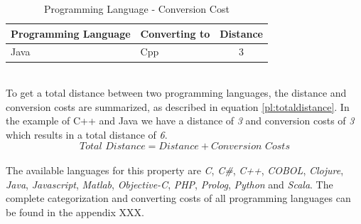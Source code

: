 \begin{table}[h]
	\centering 
	\setlength{\tabcolsep}{4pt}
	\begin{tabular}{|l|l|c|}\hline
		Programming Language	& Converting to &  Distance 	\\ \hline
		Java   				& Cpp		& 3      		\\ \hline
	\end{tabular} 
	\caption{Programming Language - Conversion Cost} 
	\label{property:proglangconversion} 
\end{table}\\
To get a total distance between two programming languages, the distance and conversion costs are summarized, as described in equation \ref{pl:totaldistance}. In the example of C++ and Java we have a distance of \textit{3} and conversion costs of \textit{3} which results in a total distance of \textit{6}.
\begin{equation}
\textit{Total Distance} = \textit{Distance} + \textit{Conversion Costs}\label{pl:totaldistance}
\end{equation}\\
The available languages for this property are \textit{C}, \textit{C\#}, \textit{C++}, \textit{COBOL}, \textit{Clojure}, \textit{Java}, \textit{Javascript}, \textit{Matlab}, \textit{Objective-C},\textit{ PHP}, \textit{Prolog}, \textit{Python} and \textit{Scala}. The complete categorization and converting costs of all programming languages can be found in the appendix XXX.

